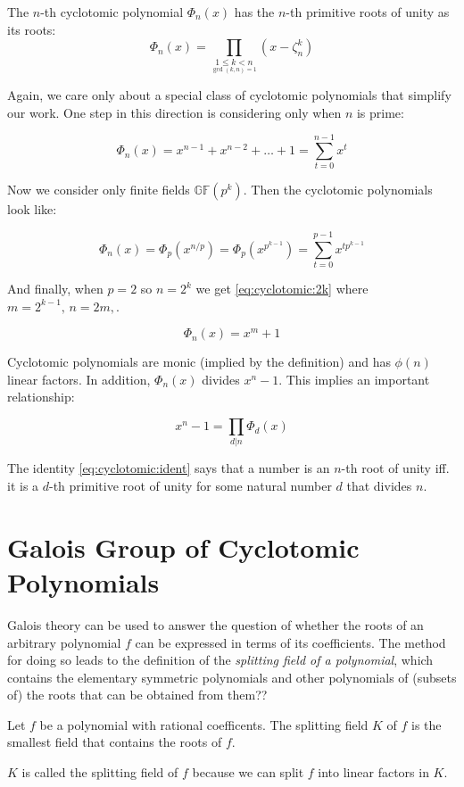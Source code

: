 \begin{definition}
    The $n$-th cyclotomic polynomial $\Phi_n(x)$ has the $n$-th primitive roots of unity as its roots: 
    \begin{equation}
        \Phi_n(x) = \prod_{\underset{\gcd(k,n)=1}{1 \leq k < n}} (x - \zeta_n^k)
    \end{equation}
\end{definition}

Again, we care only about a special class of cyclotomic polynomials that simplify our work. One step in this direction is considering only when $n$ is prime:

\begin{equation}
    \label{eq:cyclotomic:p}
    \Phi_n(x) = x^{n-1} + x^{n-2} + \dots + 1 = \sum_{t=0}^{n-1}x^t
\end{equation}

Now we consider only finite fields $\mathbb{GF}(p^k)$. Then the cyclotomic polynomials look like:

\begin{equation}
    \label{eq:cyclotomic:pk}
    \Phi_n(x) = \Phi_p(x^{n/p}) = \Phi_p(x^{p^{k-1}}) = \sum_{t=0}^{p-1}x^{tp^{k-1}}
\end{equation}

And finally, when $p=2$ so $n=2^k$ we get \eqref{eq:cyclotomic:2k} where $m=2^{k-1},\,n=2m,$.

\begin{equation}
    \label{eq:cyclotomic:2k}   
    \Phi_n(x) = x^m+1
\end{equation}

Cyclotomic polynomials are monic (implied by the definition) and has $\phi(n)$ linear factors. In addition, $\Phi_n(x)$ divides $x^n-1$. This implies an important relationship:

\begin{equation}
    \label{eq:cyclotomic:ident}
    x^n-1 = \prod_{d|n} \Phi_d(x)    
\end{equation}

The identity \eqref{eq:cyclotomic:ident} says that a number is an $n$-th root of unity iff. it is a $d$-th primitive root of unity for some natural number $d$ that divides $n$.



\section{Galois Group of Cyclotomic Polynomials}
Galois theory can be used to answer the question of whether the roots of an arbitrary polynomial $f$ can be expressed in terms of its coefficients. The method for doing so leads to the definition of the \emph{splitting field of a polynomial}, which contains the elementary symmetric polynomials and other polynomials of (subsets of) the roots that can be obtained from them??

\begin{definition}
    Let $f$ be a polynomial with rational coefficents. The splitting field $K$ of $f$ is the smallest field that contains the roots of $f$.
\end{definition}

$K$ is called the splitting field of $f$ because we can split $f$ into linear factors in $K$.

